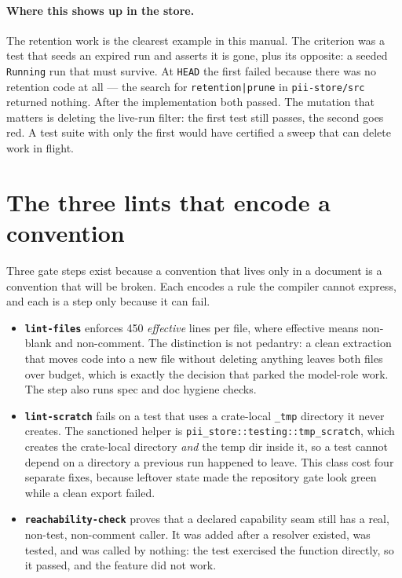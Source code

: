 \paragraph{Where this shows up in the store.} The retention work is the clearest example in
this manual. The criterion was a test that seeds an expired run and asserts it is gone, plus
its opposite: a seeded \texttt{Running} run that must survive. At \texttt{HEAD} the first
failed because there was no retention code at all --- the search for \texttt{retention|prune}
in \texttt{pii-store/src} returned nothing. After the implementation both passed. The mutation
that matters is deleting the live-run filter: the first test still passes, the second goes
red. A test suite with only the first would have certified a sweep that can delete work in
flight.

\section{The three lints that encode a convention}

Three gate steps exist because a convention that lives only in a document is a convention that
will be broken. Each encodes a rule the compiler cannot express, and each is a step only
because it can fail.

\begin{itemize}
	\item \textbf{\texttt{lint-files}} enforces 450 \emph{effective} lines per file, where
	effective means non-blank and non-comment. The distinction is not pedantry: a clean
extraction that moves code into a new file without deleting anything leaves both files over
	budget, which is exactly the decision that parked the model-role work. The step also runs
	spec and doc hygiene checks.
	\item \textbf{\texttt{lint-scratch}} fails on a test that uses a crate-local \texttt{\_tmp}
	directory it never creates. The sanctioned helper is
	\texttt{pii\_store::testing::tmp\_scratch}, which creates the crate-local directory
	\emph{and} the temp dir inside it, so a test cannot depend on a directory a previous run
	happened to leave. This class cost four separate fixes, because leftover state made the
	repository gate look green while a clean export failed.
	\item \textbf{\texttt{reachability-check}} proves that a declared capability seam still has
	a real, non-test, non-comment caller. It was added after a resolver existed, was tested,
	and was called by nothing: the test exercised the function directly, so it passed, and the
	feature did not work.
\end{itemize}

